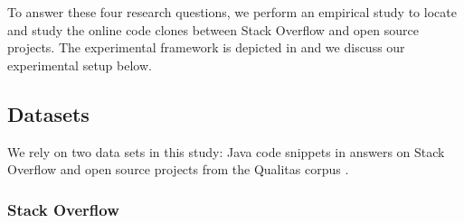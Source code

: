 \documentclass[sigconf,review, anonymous]{acmart}
\begin{document}
To answer these four research questions, we perform an empirical study to
locate and study the online code clones between Stack Overflow and open source
projects. The experimental framework is depicted in  and
we discuss our experimental setup below.



\subsection{Datasets}

We rely on two data sets in this study: Java code snippets in answers
on Stack Overflow and open source projects from the Qualitas corpus
\cite{QualitasCorpus}.

\subsubsection{Stack Overflow} 
\end{document}
